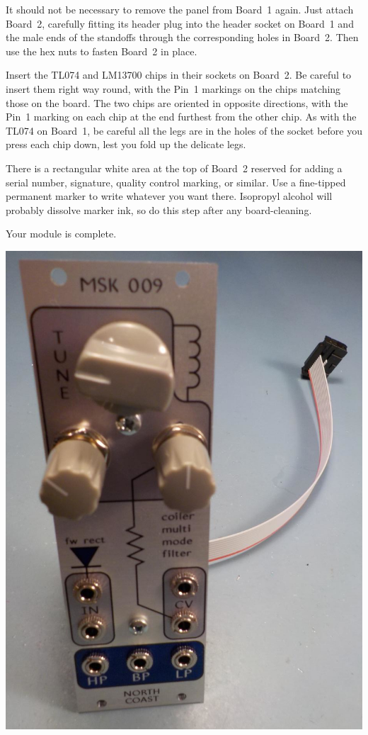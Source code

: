 It should not be necessary to remove the panel from Board~1 again.  Just
attach Board~2, carefully fitting its header
plug into the header socket on Board~1 and the male ends of the standoffs
through the corresponding holes in Board~2.  Then use the hex nuts to fasten
Board~2 in place.

Insert the TL074 and LM13700 chips in their sockets on Board~2.  Be careful
to insert them right way round, with the Pin~1 markings on the chips
matching those on the board.  The two chips are oriented in opposite
directions, with the Pin~1 marking on each chip at the end furthest from the
other chip.  As with the TL074 on Board~1, be careful all the legs are in
the holes of the socket before you press each chip down, lest you fold up
the delicate legs.

There is a rectangular white area at the top of Board~2 reserved for adding
a serial number, signature, quality control marking, or similar.  Use a
fine-tipped permanent marker to write whatever you want there.  Isopropyl
alcohol will probably dissolve marker ink, so do this step after any
board-cleaning.

Your module is complete.

\nopagebreak
\noindent\includegraphics[width=\linewidth]{finished.jpg}
